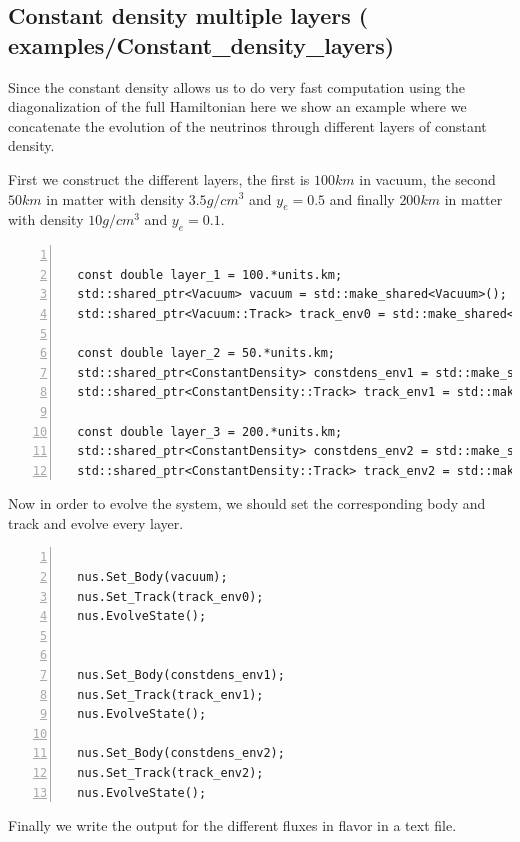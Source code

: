 \subsection{ Constant density multiple layers \textnormal{({\ttf
      examples/Constant\_density\_layers})}}
Since the constant density allows us to do very fast computation using
the diagonalization of the full Hamiltonian here we show an example
where we concatenate the evolution of the neutrinos through different
layers of constant density.

First we construct the different layers, the first is $100km$ in
vacuum, the second $50km$ in matter with density $3.5g/cm^3$ and
$y_e=0.5$ and finally $200km$ in matter with density $10g/cm^3$ and
$y_e=0.1$.
\begin{lstlisting}[frame=leftline, numbers =
  left,breaklines=true,label = ex:sin1]

  const double layer_1 = 100.*units.km;
  std::shared_ptr<Vacuum> vacuum = std::make_shared<Vacuum>();
  std::shared_ptr<Vacuum::Track> track_env0 = std::make_shared<Vacuum::Track>(layer_1);

  const double layer_2 = 50.*units.km;
  std::shared_ptr<ConstantDensity> constdens_env1 = std::make_shared<ConstantDensity>(3.5,0.5); 
  std::shared_ptr<ConstantDensity::Track> track_env1 = std::make_shared<ConstantDensity::Track>(layer_2);

  const double layer_3 = 200.*units.km;
  std::shared_ptr<ConstantDensity> constdens_env2 = std::make_shared<ConstantDensity>(10.,0.1);
  std::shared_ptr<ConstantDensity::Track> track_env2 = std::make_shared<ConstantDensity::Track>(layer_3);

\end{lstlisting}

Now in order to evolve the system, we should set the corresponding body
and track and evolve every layer.
\begin{lstlisting}[frame=leftline, numbers =
  left,breaklines=true,label = ex:sin1]

  nus.Set_Body(vacuum);
  nus.Set_Track(track_env0);
  nus.EvolveState();


  nus.Set_Body(constdens_env1);
  nus.Set_Track(track_env1);
  nus.EvolveState();

  nus.Set_Body(constdens_env2);
  nus.Set_Track(track_env2);
  nus.EvolveState();

\end{lstlisting}

Finally we write the output for the different fluxes in flavor in a text file.


